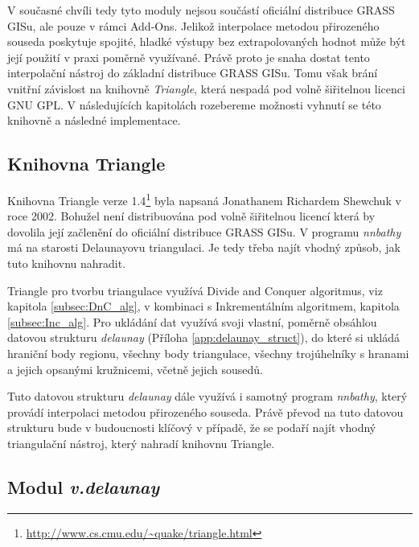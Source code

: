 \documentclass[12pt,a4paper]{article}
\begin{document}
\bigskip 

V současné chvíli tedy tyto moduly nejsou součástí oficiální distribuce GRASS GISu, 
ale pouze v rámci Add-Ons. Jelikož interpolace metodou přirozeného souseda poskytuje
spojité, hladké výstupy bez extrapolovaných hodnot může být její
použití v praxi poměrně využívané. Právě proto je snaha dostat tento
interpolační nástroj do základní distribuce GRASS GISu. Tomu však
brání vnitřní závislost na knihovně \emph{Triangle}, která nespadá pod volně
šiřitelnou licenci GNU GPL. V následujících kapitolách rozebereme
možnosti vyhnutí se této knihovně a následné implementace.

\newpage
\subsection{Knihovna Triangle}

Knihovna Triangle verze
1.4\footnote{\url{http://www.cs.cmu.edu/~quake/triangle.html}} byla napsaná
Jonathanem Richardem Shewchuk v roce 2002. Bohužel není distribuována pod
volně šiřitelnou licencí která by dovolila její začlenění do oficiální distribuce GRASS
GISu. V programu \emph{nnbathy} má na starosti Delaunayovu
triangulaci. Je tedy třeba najít vhodný způsob, jak tuto knihovnu
nahradit.

Triangle pro tvorbu triangulace využívá Divide and Conquer algoritmus,
viz kapitola \ref{subsec:DnC_alg}, v kombinaci s Inkrementálním
algoritmem, kapitola \ref{subsec:Inc_alg}. Pro ukládání dat využívá
svoji vlastní, poměrně obsáhlou datovou strukturu \emph{delaunay}
(Příloha \ref{app:delaunay_struct}), do které si ukládá hraniční body
regionu, všechny body triangulace, všechny trojúhelníky s hranami a
jejich opsanými kružnicemi, včetně jejich sousedů.

Tuto datovou strukturu \emph{delaunay} dále využívá i samotný program
\emph{nnbathy}, který provádí interpolaci metodou přirozeného
souseda. Právě převod na tuto datovou strukturu bude v budoucnosti
klíčový v případě, že se podaří najít vhodný triangulační nástroj,
který nahradí knihovnu Triangle.

\newpage
\subsection{Modul \emph{v.delaunay}}
\label{subsec:v.delaunay}
\end{document}
